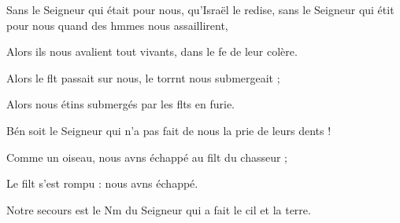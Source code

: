 \item Sans le Seigneur qui était pour nous, qu’Israël le redise,\pscross{} sans le Seigneur qui étit pour nous\psstar{} quand des hmmes nous assaillirent,
\item Alors ils nous avalient tout vivants,\psstar{} dans le fe de leur colère.
\item Alors le flt passait sur nous,\psstar{} le torrnt nous submergeait ;
\item Alors nous étins submergés\psstar{} par les flts en furie.
\item Bén soit le Seigneur\psstar{} qui n’a pas fait de nous la prie de leurs dents !
\item Comme un oiseau, nous avns échappé\psstar{} au filt du chasseur ;
\item Le filt s’est rompu :\psstar{} nous avns échappé.
\item Notre secours est le Nm du Seigneur\psstar{} qui a fait le cil et la terre.